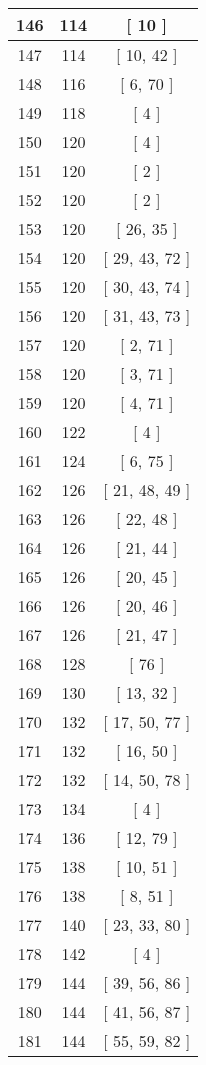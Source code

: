 \begin{center}
\begin{longtable}[H]{|| c c c ||}
\hline
146 & 114 & [ 10 ] \\ 
\hline
147 & 114 & [ 10, 42 ] \\ 
\hline
148 & 116 & [ 6, 70 ] \\ 
\hline
149 & 118 & [ 4 ] \\ 
\hline
150 & 120 & [ 4 ] \\ 
\hline
151 & 120 & [ 2 ] \\ 
\hline
152 & 120 & [ 2 ] \\ 
\hline
153 & 120 & [ 26, 35 ] \\ 
\hline
154 & 120 & [ 29, 43, 72 ] \\ 
\hline
155 & 120 & [ 30, 43, 74 ] \\ 
\hline
156 & 120 & [ 31, 43, 73 ] \\ 
\hline
157 & 120 & [ 2, 71 ] \\ 
\hline
158 & 120 & [ 3, 71 ] \\ 
\hline
159 & 120 & [ 4, 71 ] \\ 
\hline
160 & 122 & [ 4 ] \\ 
\hline
161 & 124 & [ 6, 75 ] \\ 
\hline
162 & 126 & [ 21, 48, 49 ] \\ 
\hline
163 & 126 & [ 22, 48 ] \\ 
\hline
164 & 126 & [ 21, 44 ] \\ 
\hline
165 & 126 & [ 20, 45 ] \\ 
\hline
166 & 126 & [ 20, 46 ] \\ 
\hline
167 & 126 & [ 21, 47 ] \\ 
\hline
168 & 128 & [ 76 ] \\ 
\hline
169 & 130 & [ 13, 32 ] \\ 
\hline
170 & 132 & [ 17, 50, 77 ] \\ 
\hline
171 & 132 & [ 16, 50 ] \\ 
\hline
172 & 132 & [ 14, 50, 78 ] \\ 
\hline
173 & 134 & [ 4 ] \\ 
\hline
174 & 136 & [ 12, 79 ] \\ 
\hline
175 & 138 & [ 10, 51 ] \\ 
\hline
176 & 138 & [ 8, 51 ] \\ 
\hline
177 & 140 & [ 23, 33, 80 ] \\ 
\hline
178 & 142 & [ 4 ] \\ 
\hline
179 & 144 & [ 39, 56, 86 ] \\ 
\hline
180 & 144 & [ 41, 56, 87 ] \\ 
\hline
181 & 144 & [ 55, 59, 82 ] \\ 

\end{longtable}
\end{center}
